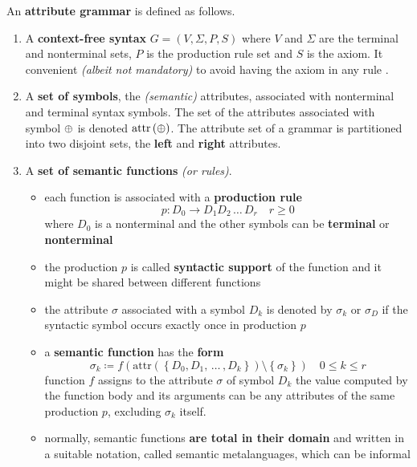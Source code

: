\documentclass[english]{article}
\begin{document}
\begin{definition}
  \label{def:attribute-grammar}
  An \textbf{attribute grammar} is defined as follows.

  \begin{enumerate}
    \item A \textbf{context-free syntax} \(G = \left( V, \Sigma, P, S \right)\) where \(V\) and \(\Sigma\) are the terminal and nonterminal sets, \(P\) is the production rule set and \(S\) is the axiom.
          It convenient \textit{(albeit not mandatory)} to avoid having the axiom in any rule \RP.
    \item A \textbf{set of symbols}, the \textit{(semantic)} attributes, associated with nonterminal and terminal syntax symbols.
          The set of the attributes associated with symbol \(\oplus\) is denoted \(\text{attr}\left( \oplus \right)\).
          The attribute set of a grammar is partitioned into two disjoint sets, the \textbf{left} and \textbf{right} attributes.
    \item A \textbf{set of semantic functions} \textit{(or rules)}.
          \begin{itemize}
            \item each function is associated with a \textbf{production rule}
                  \[ p: D_0 \rightarrow D_1 D_2 \,\ldots\, D_r \quad r \geq 0\]
                  where \(D_0\) is a nonterminal and the other symbols can be \textbf{terminal} or \textbf{nonterminal}
            \item the production \(p\) is called \textbf{syntactic support} of the function and it might be shared between different functions
            \item the attribute \(\sigma\) associated with a symbol \(D_k\) is denoted by \(\sigma_k\) or \(\sigma_D\) if the syntactic symbol occurs exactly once in production \(p\)
            \item a \textbf{semantic function} has the \textbf{form}
                  \[ \sigma_k \coloneqq f \left( \text{attr} \left( \left\{ D_0, D_1, \,\ldots\, , D_k \right\} \right) \setminus \left\{ \sigma_k \right\}\right) \quad 0 \leq k \leq r \]
                  function \(f\) assigns to the attribute \(\sigma\) of symbol \(D_k\) the value computed by the function body and its arguments can be any attributes of the same production \(p\), excluding \(\sigma_k\) itself.
            \item normally, semantic functions \textbf{are total in their domain} and written in a suitable notation, called semantic metalanguages, which can be informal

\end{itemize}
\end{enumerate}
\end{definition}
\end{document}

